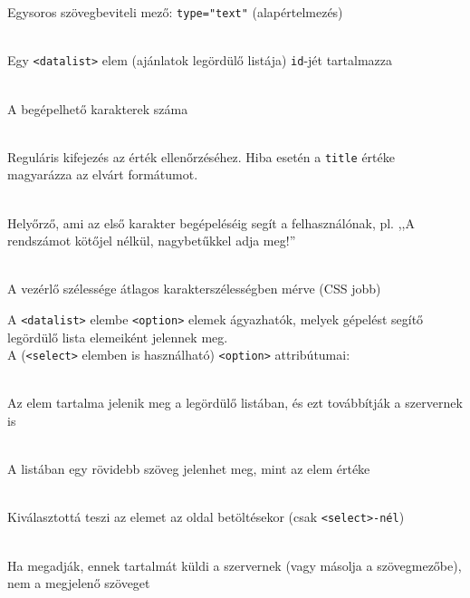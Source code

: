 \begin{frame}
  Egysoros szövegbeviteli mező: \texttt{type="text"} (alapértelmezés)
  \begin{description}[m]
    \item[\texttt{list}] \hfill \\ Egy \texttt{<datalist>} elem (ajánlatok legördülő listája) \texttt{id}-jét tartalmazza
    \item[\texttt{maxlength}] \hfill \\ A begépelhető karakterek száma
    \item[\texttt{pattern}] \hfill \\ Reguláris kifejezés az érték ellenőrzéséhez. Hiba esetén a \texttt{title} értéke magyarázza az elvárt formátumot.
    \item[\texttt{placeholder}] \hfill \\ Helyőrző, ami az első karakter begépeléséig segít a felhasználónak, pl. ,,A rendszámot kötőjel nélkül, nagybetűkkel adja meg!''
    \item[\texttt{size}] \hfill \\ A vezérlő szélessége átlagos karakterszélességben mérve (CSS jobb)
  \end{description}
\end{frame}

\begin{frame}
  A \texttt{<datalist>} elembe \texttt{<option>} elemek ágyazhatók, 
  melyek gépelést segítő legördülő lista elemeiként jelennek meg.\\
  A (\texttt{<select>} elemben is használható) \texttt{<option>} attribútumai:
  \begin{description}[m]
    \item[\emph{attribútum nélkül}] \hfill \\ Az elem tartalma jelenik meg a legördülő listában, és ezt továbbítják a szervernek is
    \item[\texttt{label}] \hfill \\ A listában egy rövidebb szöveg jelenhet meg, mint az elem értéke
    \item[\texttt{selected}] \hfill \\ Kiválasztottá teszi az elemet az oldal betöltésekor (csak \texttt{<select>-nél})
    \item[\texttt{value}] \hfill \\ Ha megadják, ennek tartalmát küldi a szervernek (vagy másolja a szövegmezőbe), nem a megjelenő szöveget
  \end{description}
\end{frame}

